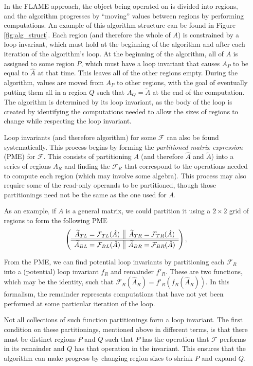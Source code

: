 \documentclass[12pt,letterpaper]{article}
\newcommand*{\opF}{\mathcal{F}}
\newcommand*{\opf}{f}
\begin{document}
In the FLAME approach, the object being operated on is divided into regions, and the algorithm progresses by ``moving'' values between regions by performing computations.
An example of this algorithm structure can be found in Figure \ref{fig:alg_struct}.
Each region (and therefore the whole of $A$) is constrained by a loop invariant, which must hold at the beginning of the algorithm and after each iteration of the algorithm's loop.
At the beginning of the algorithm, all of $A$ is assigned to some region $P$, which must have a loop invariant that causes $A_P$ to be equal to $\hat{A}$ at that time.
This leaves all of the other regions empty.
During the algorithm, values are moved from $A_P$ to other regions, with the goal of eventually putting them all in a region $Q$ such that $A_Q = \widetilde{A}$ at the end of the computation.
The algorithm is determined by its loop invariant, as the body of the loop is created by identifying the computations needed to allow the sizes of regions to change while respecting the loop invariant.

Loop invariants (and therefore algorithm) for some $\opF$ can also be found systematically.
This process begins by forming the \emph{partitioned matrix expression} (PME) for $\opF$.
This consists of partitioning $A$ (and therefore $\hat{A}$ and $\widetilde{A}$) into a series of regions $A_R$ and finding the $\opF_R$ that correspond to the operations needed to compute each region (which may involve some algebra).
This process may also require some of the read-only operands to be partitioned, though those partitionings need not be the same as the one used for $A$.

As an example, if $A$ is a general matrix, we could partition it using a $2 \times 2$ grid of regions to form the following PME
\begin{equation*}
  \FlaTwoByTwo{\widetilde{A}_{TL} = \opF_{TL}(\hat{A})}{\widetilde{A}_{TR} = \opF_{TR}(\hat{A})}
  {\widetilde{A}_{BL} = \opF_{BL}(\hat{A})}{\widetilde{A}_{BR} = \opF_{BR}(\hat{A})},
\end{equation*}

From the PME, we can find potential loop invariants by partitioning each $\opF_R$ into a (potential) loop invariant $\opf_R$ and remainder $\opf'_R$.
These are two functions, which may be the identity, such that $\opF_R(\hat{A}_R) = \opf'_R(\opf_R(\hat{A}_R))$.
In this formalism, the remainder represents computations that have not yet been performed at some particular iteration of the loop.

Not all collections of such function partitionings form a loop invariant.
The first condition on these partitionings, mentioned above in different terms, is that there must be distinct regions $P$ and $Q$ such that $P$ has the operation that $\opF$ performs in its remainder and $Q$ has that operation in the invariant.
This ensures that the algorithm can make progress by changing region sizes to shrink $P$ and expand $Q$.
\end{document}
